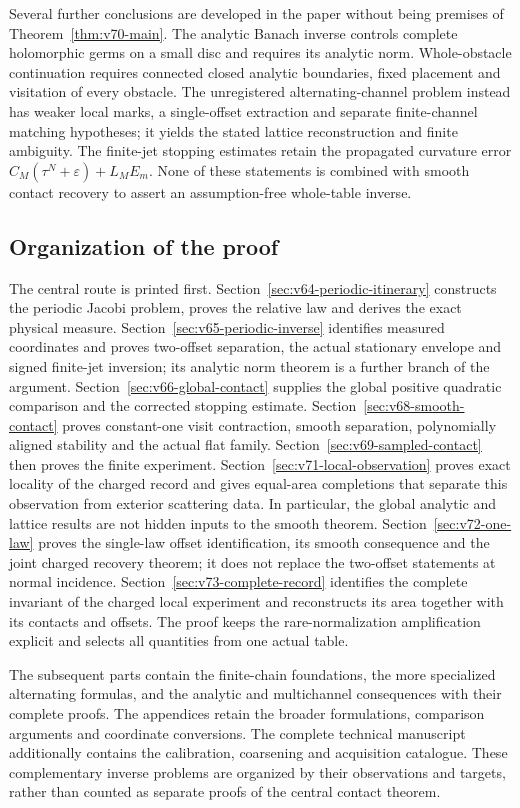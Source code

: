 Several further conclusions are developed in the paper without being
premises of Theorem~\ref{thm:v70-main}.  The analytic Banach inverse
controls complete holomorphic germs on a small disc and requires its
analytic norm.  Whole-obstacle continuation requires connected closed
analytic boundaries, fixed placement and visitation of every obstacle.
The unregistered alternating-channel problem instead has weaker local
marks, a single-offset extraction and separate finite-channel matching
hypotheses; it yields the stated lattice reconstruction and finite
ambiguity.  The finite-jet stopping estimates retain the propagated
curvature error $C_M(\tau^N+\varepsilon)+L_ME_m$.  None of these
statements is combined with smooth contact recovery to assert an
assumption-free whole-table inverse.

\subsection{Organization of the proof}

The central route is printed first.  Section~\ref{sec:v64-periodic-itinerary}
constructs the periodic Jacobi problem, proves the relative law and derives
the exact physical measure.  Section~\ref{sec:v65-periodic-inverse}
identifies measured coordinates and proves two-offset separation, the
actual stationary envelope and signed finite-jet inversion; its analytic
norm theorem is a further branch of the argument.
Section~\ref{sec:v66-global-contact} supplies the global positive
quadratic comparison and the corrected stopping estimate.
Section~\ref{sec:v68-smooth-contact} proves constant-one visit contraction,
smooth separation, polynomially aligned stability and the actual flat
family.  Section~\ref{sec:v69-sampled-contact} then proves the finite
experiment.  Section~\ref{sec:v71-local-observation} proves exact
locality of the charged record and gives equal-area completions that
separate this observation from exterior scattering data.  In particular,
the global analytic and lattice results are
not hidden inputs to the smooth theorem.  Section~\ref{sec:v72-one-law}
proves the single-law offset identification, its smooth consequence and
the joint charged recovery theorem; it does not replace the two-offset
statements at normal incidence.
Section~\ref{sec:v73-complete-record} identifies the complete invariant
of the charged local experiment and reconstructs its area together with
its contacts and offsets.  The proof keeps the rare-normalization
amplification explicit and selects all quantities from one actual table.

The subsequent parts contain the finite-chain foundations, the more
specialized alternating formulas, and the analytic and multichannel
consequences with their complete proofs.  The appendices retain the
broader formulations, comparison arguments and coordinate conversions.
The complete technical manuscript additionally contains the calibration,
coarsening and acquisition catalogue.  These complementary inverse
problems are organized by their observations and targets, rather than
counted as separate proofs of the central contact theorem.

